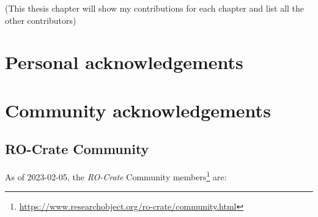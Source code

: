 \label{ch11:acknowledgements}

(This thesis chapter will show my contributions for each chapter and
list all the other contributors)

\hypertarget{personal-acknowledgements}{%
\section{Personal acknowledgements}\label{personal-acknowledgements}}

\hypertarget{community-acknowledgements}{%
\section{Community
acknowledgements}\label{community-acknowledgements}}

\subsection{RO-Crate Community}\label{communitylist}
\label{ro-crate-community}

As of 2023-02-05, the \emph{RO-Crate} Community members\footnote{\url{https://www.researchobject.org/ro-crate/community.html}} are:

